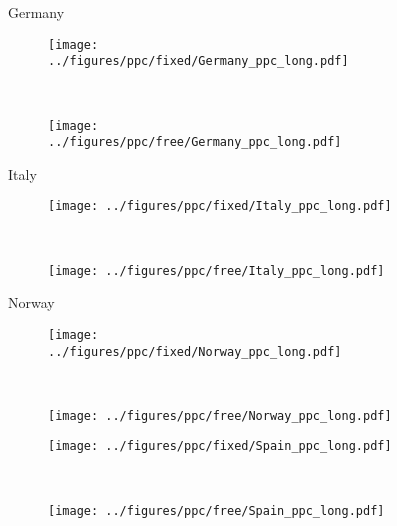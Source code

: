 \documentclass[12pt]{extarticle}
\begin{document}
\begin{figure*}
    \ContinuedFloat 
	\caption*{Germany}    
    \begin{subfigure}{0.45\textwidth}
        \texttt{[image: ../figures/ppc/fixed/Germany\_ppc\_long.pdf]}
    \end{subfigure}
    ~
    \begin{subfigure}{0.45\textwidth}
        \texttt{[image: ../figures/ppc/free/Germany\_ppc\_long.pdf]}
    \end{subfigure}
	\caption*{Italy}    
    \begin{subfigure}{0.45\textwidth}
        \texttt{[image: ../figures/ppc/fixed/Italy\_ppc\_long.pdf]}
    \end{subfigure}
    ~
    \begin{subfigure}{0.45\textwidth}
        \texttt{[image: ../figures/ppc/free/Italy\_ppc\_long.pdf]}
    \end{subfigure}
	\caption*{Norway}    
    \begin{subfigure}{0.45\textwidth}
        \texttt{[image: ../figures/ppc/fixed/Norway\_ppc\_long.pdf]}
    \end{subfigure}
    ~
    \begin{subfigure}{0.45\textwidth}
        \texttt{[image: ../figures/ppc/free/Norway\_ppc\_long.pdf]}
    \end{subfigure}
	\caption*{Spain}     
    \begin{subfigure}{0.45\textwidth}
        \texttt{[image: ../figures/ppc/fixed/Spain\_ppc\_long.pdf]}
    \end{subfigure}
    ~
    \begin{subfigure}{0.45\textwidth}
        \texttt{[image: ../figures/ppc/free/Spain\_ppc\_long.pdf]}
    \end{subfigure}
\end{figure*}
\end{document}
